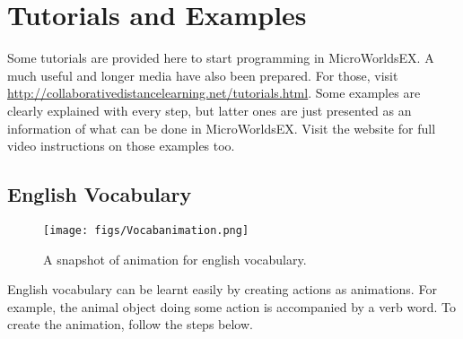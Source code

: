\section{Tutorials and Examples}

Some tutorials are provided here to start programming in MicroWorldsEX. A much useful and longer media have also been prepared. For those, visit \url{http://collaborativedistancelearning.net/tutorials.html}. Some examples are clearly explained with every step, but latter ones are just presented as an information of what can be done in MicroWorldsEX. Visit the website for full video instructions on those examples too.

\subsection{English Vocabulary}
\begin{figure}
\centering
\texttt{[image: figs/Vocabanimation.png]}
\caption{A snapshot of animation for english vocabulary.}
\label{fig:Vocabulary Animation}
\end{figure}

English vocabulary can be learnt easily by creating actions as animations. For example, the animal object doing some action is accompanied by a verb word. To create the animation, follow the steps below. 

